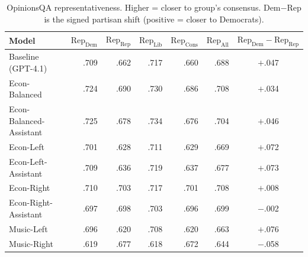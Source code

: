 \begin{table}[h]
\centering
\caption{OpinionsQA representativeness. Higher = closer to group's consensus. Dem$-$Rep is the signed partisan shift (positive = closer to Democrats).}
\label{tab:opinions-qa}
\small
\begin{tabular}{l rrrrr c}
\toprule
Model & $\mathrm{Rep}_{\text{Dem}}$ & $\mathrm{Rep}_{\text{Rep}}$ & $\mathrm{Rep}_{\text{Lib}}$ & $\mathrm{Rep}_{\text{Cons}}$ & $\mathrm{Rep}_{\text{All}}$ & $\mathrm{Rep}_{\text{Dem}} - \mathrm{Rep}_{\text{Rep}}$ \\
\midrule
Baseline (GPT-4.1) & .709 & .662 & .717 & .660 & .688 & $+$.047 \\
\addlinespace
Econ-Balanced & .724 & .690 & .730 & .686 & .708 & $+$.034 \\
Econ-Balanced-Assistant & .725 & .678 & .734 & .676 & .704 & $+$.046 \\
Econ-Left & .701 & .628 & .711 & .629 & .669 & $+$.072 \\
Econ-Left-Assistant & .709 & .636 & .719 & .637 & .677 & $+$.073 \\
Econ-Right & .710 & .703 & .717 & .701 & .708 & $+$.008 \\
Econ-Right-Assistant & .697 & .698 & .703 & .696 & .699 & $-$.002 \\
\addlinespace
Music-Left & .696 & .620 & .708 & .620 & .663 & $+$.076 \\
Music-Right & .619 & .677 & .618 & .672 & .644 & $-$.058 \\
\bottomrule
\end{tabular}
\end{table}

